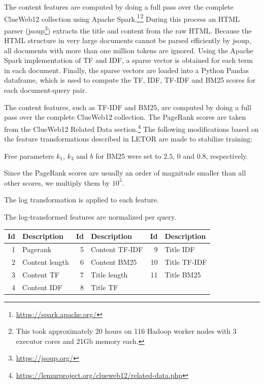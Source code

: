 The content features are computed by doing a full pass over the complete ClueWeb12 collection using Apache Spark.\footnote{\url{https://spark.apache.org/}}$^{ }$\footnote{This took approximately 20 hours on 116 Hadoop worker nodes with 3 executor cores and 21Gb memory each.}
During this process an HTML parser (jsoup\footnote{\url{https://jsoup.org/}}) extracts the title and content from the raw HTML.
Because the HTML structure in very large documents cannot be parsed efficiently by jsoup, all documents with more than one million tokens are ignored.
Using the Apache Spark implementation of TF and IDF, a sparse vector is obtained for each term in each document. Finally, the sparse vectors are loaded into a Python Pandas dataframe, which is used to compute the TF, IDF, TF-IDF and BM25 scores for each document-query pair.
\fi

The content features, such as TF-IDF and BM25, are computed by doing a full pass over the complete ClueWeb12 collection.
The PageRank scores are taken from the ClueWeb12 Related Data section.\footnote{\url{https://lemurproject.org/clueweb12/related-data.php}}
The following modifications based on the feature transformations described in LETOR are made to stabilize training:
\begin{inparaenum}[(1)]%
\item Free parameters $k_1$, $k_3$ and $b$ for BM25 were set to $2.5$, $0$ and $0.8$, respectively. 
\item Since the PageRank scores are usually an order of magnitude smaller than all other scores, we multiply them by $10^5$.
\item The log transformation is applied to each feature.
\item The log-transformed features are normalized per query.  
\end{inparaenum}

\begin{table}[t]
\centering
{}  \label{tab:setdescription} 
\begin{tabular}{rlrlrl}
\toprule
Id & Description & Id & Description & Id & Description    \\ 
\midrule
1  & Pagerank  & 5  & Content TF-IDF  & 9  & Title IDF   \\
2  & Content length & 6  & Content BM25   & 10 & Title TF-IDF   \\
3  & Content TF  & 7  & Title length & 11 & Title BM25  \\
4  & Content IDF & 8  & Title TF  & & \\
\bottomrule
\end{tabular}
\end{table}

